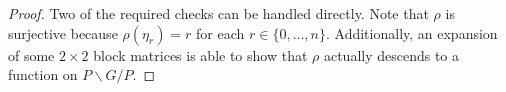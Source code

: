 \begin{proof}
    Two of the required checks can be handled directly. Note that $\rho$ is surjective because $\rho(\eta_r)=r$ for each $r\in\{0,\ldots,n\}$. Additionally, an expansion of some $2\times2$ block matrices is able to show that $\rho$ actually descends to a function on $P\backslash G/P$.


\end{proof}
